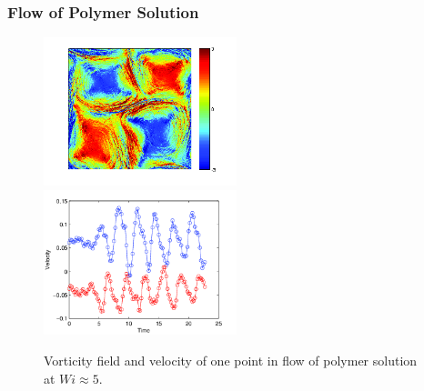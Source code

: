 \begin{frame}
  \frametitle{Flow of Polymer Solution}
\begin{figure}[ht]
\includegraphics[width=0.5\textwidth]{img/polymer_loc-12.png}
\includegraphics[width=0.5\textwidth]{img/polymer_loc-7.png}
\caption{Vorticity field and velocity of one point in flow of polymer solution at $Wi\approx5$.}
\label{fug:vor_pol5}
\end{figure}
\end{frame}
